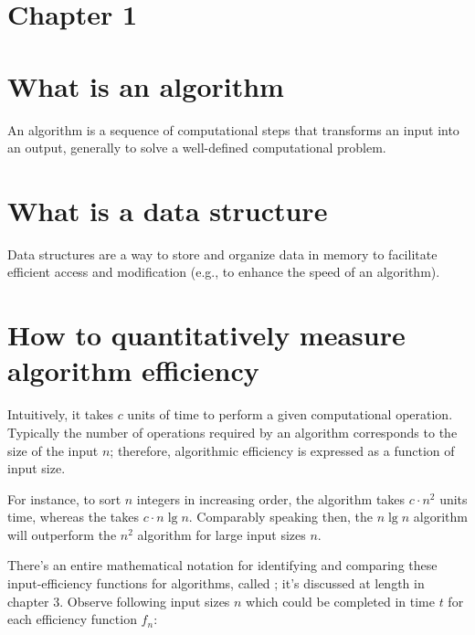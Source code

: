 
\section*{\Huge\bfseries Chapter 1}

\section{What is an algorithm}
An algorithm is a sequence of computational steps that transforms an input into an output, generally to solve a well-defined computational problem.

\section{What is a data structure}
Data structures are a way to store and organize data in memory to facilitate efficient access and modification (e.g., to enhance the speed of an algorithm).

\section{How to quantitatively measure algorithm efficiency}
Intuitively, it takes $c$ units of time to perform a given computational operation. Typically the number of operations required by an algorithm corresponds to the size of the input $n$; therefore, algorithmic efficiency is expressed as a function of input size. 

For instance, to sort $n$ integers in increasing order, the  algorithm takes $c \cdot n^2$ units time, whereas the  takes $c \cdot n \lg n$. Comparably speaking then, the $n \lg n$ algorithm will outperform the $n^2$ algorithm for large input sizes $n$. 

There's an entire mathematical notation for identifying and comparing these input-efficiency functions for algorithms, called ; it's discussed at length in chapter 3. Observe following input sizes $n$ which could be completed in time $t$ for each efficiency function $f_n$:

